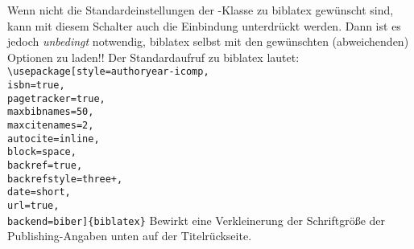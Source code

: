  Wenn nicht \dfalse die Standardeinstellungen der \HSKLbook-Klasse zu biblatex gewünscht sind, kann mit diesem Schalter auch die Einbindung unterdrückt werden. Dann ist es jedoch \emph{unbedingt} notwendig, biblatex selbst mit den gewünschten (abweichenden) Optionen zu laden!! Der Standardaufruf zu biblatex lautet:\\\verb!\usepackage[style=authoryear-icomp,!\\\verb!isbn=true,!\\\verb!pagetracker=true,!\\\verb!maxbibnames=50,!\\\verb!maxcitenames=2,!\\\verb!autocite=inline,!\\\verb!block=space,!\\\verb!backref=true,!\\\verb!backrefstyle=three+,!\\\verb!date=short,!\\\verb!url=true,!\\\verb!backend=biber]{biblatex}!
 Bewirkt eine \dfalse Verkleinerung der Schriftgröße der Publishing-Angaben unten auf der Titelrückseite.
\fi%

